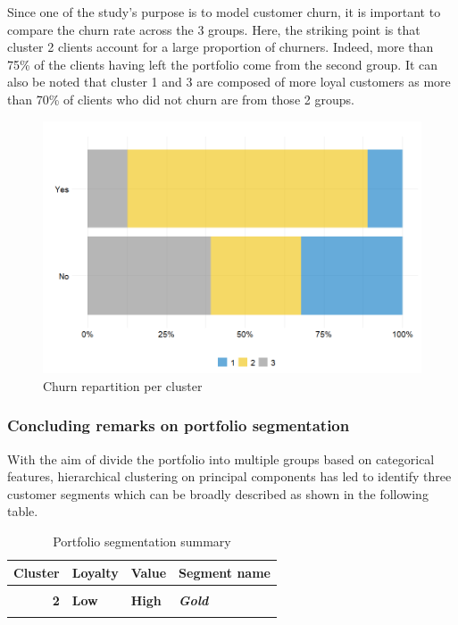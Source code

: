 \documentclass[
]{book}
\begin{document}
Since one of the study's purpose is to model customer churn, it is important to compare the churn rate across the 3 groups. Here, the striking point is that cluster 2 clients account for a large proportion of churners. Indeed, more than 75\% of the clients having left the portfolio come from the second group. It can also be noted that cluster 1 and 3 are composed of more loyal customers as more than 70\% of clients who did not churn are from those 2 groups.

\begin{figure}

{\centering \includegraphics[width=0.6\linewidth,height=0.6\textheight]{./imgs/churn_cluster_barplot} 

}

\caption{Churn repartition per cluster}\label{fig:catvarsclust}
\end{figure}

\hypertarget{concluding-remarks-on-portfolio-segmentation}{%
\subsubsection*{Concluding remarks on portfolio segmentation}\label{concluding-remarks-on-portfolio-segmentation}}

With the aim of divide the portfolio into multiple groups based on categorical features, hierarchical clustering on principal components has led to identify three customer segments which can be broadly described as shown in the following table.

\begin{table}[H]

\caption{\label{tab:unnamed-chunk-25}Portfolio segmentation summary}
\centering
\begin{tabular}[t]{rll>{}l}
\toprule
Cluster & Loyalty & Value & Segment name\\
\midrule
\cellcolor{gray!6}{1} & \cellcolor{gray!6}{High} & \cellcolor{gray!6}{Low} & \em{\cellcolor{gray!6}{Silver}}\\
\textbf{2} & \textbf{Low} & \textbf{High} & \textbf{\em{Gold}}\\
\cellcolor{gray!6}{3} & \cellcolor{gray!6}{High} & \cellcolor{gray!6}{High} & \em{\cellcolor{gray!6}{Platinum}}\\
\bottomrule
\end{tabular}
\end{table}
\end{document}
